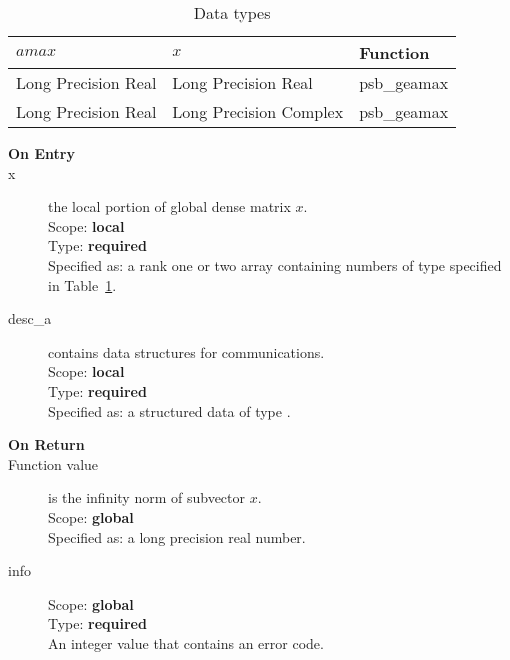 
\begin{table}[h]
\begin{center}
\begin{tabular}{lll}
\hline
$amax$ & $x$ & {\bf Function}\\
\hline
Long Precision Real&Long Precision Real & psb\_geamax \\
Long Precision Real&Long Precision Complex & psb\_geamax \\
\hline
\end{tabular}
\end{center}
\caption{Data types\label{tab:f90amax}}
\end{table}


\begin{description}
\item[\bf On Entry]
\item[x] the local portion of global dense matrix
$x$. %
\\
Scope: {\bf local} \\
Type: {\bf required} \\
Specified as:  a rank one or two array  
containing numbers of type specified in
Table~\ref{tab:f90amax}.
\item[desc\_a] contains data structures for communications.\\
Scope: {\bf local} \\
Type: {\bf required}\\
Specified as: a structured data of type \descdata.

\item[\bf On Return] 
\item[Function value] is the infinity norm of subvector $x$.\\
Scope: {\bf global} \\
Specified as: a long precision real number.
\item[info] 
Scope: {\bf global} \\
Type: {\bf required} \\
An integer value that contains an error code. 
\end{description}
%
%


